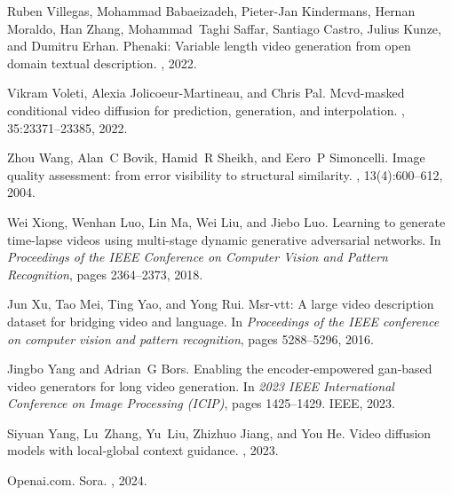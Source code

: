 \documentclass{article}
\begin{document}
\begin{thebibliography}{}
Ruben Villegas, Mohammad Babaeizadeh, Pieter-Jan Kindermans, Hernan Moraldo, Han Zhang, Mohammad~Taghi Saffar, Santiago Castro, Julius Kunze, and Dumitru Erhan.
\newblock Phenaki: Variable length video generation from open domain textual description.
, 2022.

Vikram Voleti, Alexia Jolicoeur-Martineau, and Chris Pal.
\newblock Mcvd-masked conditional video diffusion for prediction, generation, and interpolation.
, 35:23371--23385, 2022.

Zhou Wang, Alan~C Bovik, Hamid~R Sheikh, and Eero~P Simoncelli.
\newblock Image quality assessment: from error visibility to structural similarity.
, 13(4):600--612, 2004.

Wei Xiong, Wenhan Luo, Lin Ma, Wei Liu, and Jiebo Luo.
\newblock Learning to generate time-lapse videos using multi-stage dynamic generative adversarial networks.
\newblock In {\em Proceedings of the IEEE Conference on Computer Vision and Pattern Recognition}, pages 2364--2373, 2018.

Jun Xu, Tao Mei, Ting Yao, and Yong Rui.
\newblock Msr-vtt: A large video description dataset for bridging video and language.
\newblock In {\em Proceedings of the IEEE conference on computer vision and pattern recognition}, pages 5288--5296, 2016.

Jingbo Yang and Adrian~G Bors.
\newblock Enabling the encoder-empowered gan-based video generators for long video generation.
\newblock In {\em 2023 IEEE International Conference on Image Processing (ICIP)}, pages 1425--1429. IEEE, 2023.

Siyuan Yang, Lu~Zhang, Yu~Liu, Zhizhuo Jiang, and You He.
\newblock Video diffusion models with local-global context guidance.
, 2023.

Openai.com.
\newblock Sora.
, 2024.


\end{thebibliography}
\end{document}
